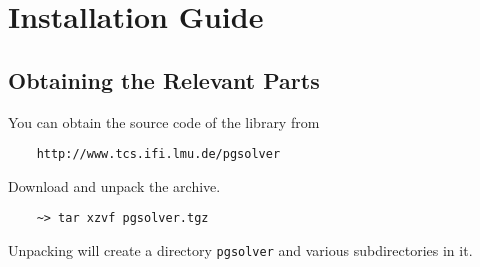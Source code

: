 \section{Installation Guide}

\subsection{Obtaining the Relevant Parts}

You can obtain the source code of the \pgsolver library from
\begin{verbatim}
    http://www.tcs.ifi.lmu.de/pgsolver
\end{verbatim}
Download and unpack the archive.
\begin{verbatim}
    ~> tar xzvf pgsolver.tgz
\end{verbatim}
Unpacking will create a directory \texttt{pgsolver} and various
subdirectories in it.

